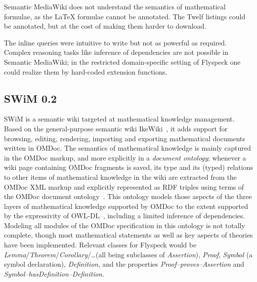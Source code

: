 Semantic MediaWiki does not understand the semantics of mathematical formulae,
as the {\LaTeX} formulae cannot be annotated.  The Twelf listings could be
annotated, but at the cost of making them harder to download.

The inline queries were intuitive to write but not as powerful as required.
Complex reasoning tasks like inference of dependencies are not possible in
Semantic MediaWiki; in the restricted domain-specific setting of Flyspeck one
could realize them by hard-coded extension functions.

\subsection{SWiM 0.2}
\label{sec:swim}

SWiM is a semantic wiki targeted at mathematical knowledge management.  Based on
the general-purpose semantic wiki IkeWiki~\cite{KrSchVr:semwiki-reasoning07}, it
adds support for browsing, editing, rendering, importing and exporting
mathematical documents written in OMDoc.  The semantics of mathematical
knowledge is mainly captured in the OMDoc markup, and more explicitly in a
\emph{document ontology}; whenever a wiki page containing OMDoc fragments is
saved, its type and its (typed) relations to other items of mathematical
knowledge in the wiki are extracted from the OMDoc XML markup and explicitly
represented as RDF triples using terms of the OMDoc document
ontology~\cite{OMDocDocOnto:web}.  This ontology models those aspects of the
three layers of mathematical knowledge supported by OMDoc to the extent
supported by the expressivity of OWL-DL~\cite{McGvHa:owl04}, including a limited
inference of dependencies.  Modeling all modules of the OMDoc specification in
this ontology is not totally complete, though most mathematical statements as
well as key aspects of theories have been implemented.  Relevant classes for
Flyspeck would be \textit{Lemma}/\textit{Theorem}/\textit{Corollary}/\ldots (all
being subclasses of \textit{Assertion}), \textit{Proof}, \textit{Symbol} (a
symbol declaration), \textit{Definition}, and the properties
\textit{Proof--proves--Assertion} and
\textit{Symbol--hasDefinition--Definition}.

